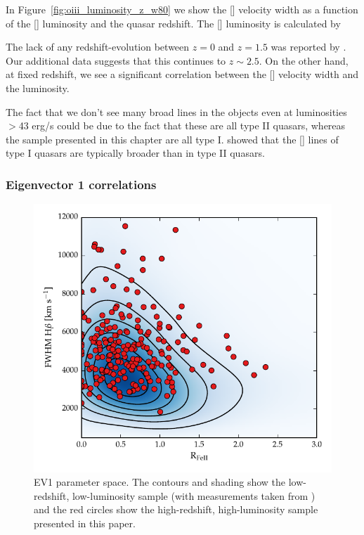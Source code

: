 In Figure~\ref{fig:oiii_luminosity_z_w80} we show the [] velocity width as a function of the [] luminosity and the quasar redshift. 
The [] luminosity is calculated by 

The lack of any redshift-evolution between $z=0$ and $z=1.5$ was reported by \citet{harrison16}.
Our additional data suggests that this continues to $z\sim2.5$. 
On the other hand, at fixed redshift, we see a significant correlation between the [] velocity width and the luminosity. 

The fact that we don't see many broad lines in the \citet{zakamska14} objects even at luminosities $>$43 erg/s could be due to the fact that these are all type II quasars, whereas the sample presented in this chapter are all type I. 
\citet{mullaney13} showed that the [] lines of type I quasars are typically broader than in type II quasars. 



\subsubsection{Eigenvector 1 correlations}

\begin{figure}
    \includegraphics[width=\columnwidth]{figures/chapter04/ev1_lowz.pdf} 
    \caption{\ac{EV1} parameter space. The contours and shading show the low-redshift, low-luminosity sample (with measurements taken from \citet{shen11}) and the red circles show the high-redshift, high-luminosity sample presented in this paper.}      
    \label{fig:ev1_lowz}
\end{figure}

